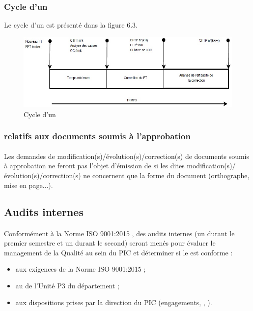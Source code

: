 \subsubsection*{Cycle d'un \FTCourt}
Le cycle d'un \FTCourt{} est présenté dans la figure 6.3.

\begin{figure}[h]
   \center
   \caption{\label{Figure 6.1} Cycle d'un \FT}
   \includegraphics[width=13cm]{./images/cycle_d_un_fait_technique.jpg}
\end{figure}

\subsubsection*{\FTCourt{} relatifs aux documents soumis à l’approbation}
\paragraph*{} Les demandes de modification(s)/évolution(s)/correction(s) de documents soumis à approbation ne feront pas l'objet d'émission de \FTCourt{} si les dites modification(s)/évolution(s)/correction(s) ne concernent que la forme du document (orthographe, mise en page...).

\subsection{Audits internes}
\paragraph*{} Conformément à la Norme ISO 9001:2015 , des audits internes (un durant le premier semestre et un durant le second) seront menés pour évaluer le management de la Qualité au sein du PIC et déterminer si le \SMQCourt{} est conforme :
\begin{itemize}
\item aux exigences de la Norme ISO 9001:2015 ;
\item au \SMQ{} de l'Unité P3 du département \ASI ;
\item aux dispositions prises par la direction du PIC (engagements, \PQCourt , \PGCCourt).
\end{itemize}
